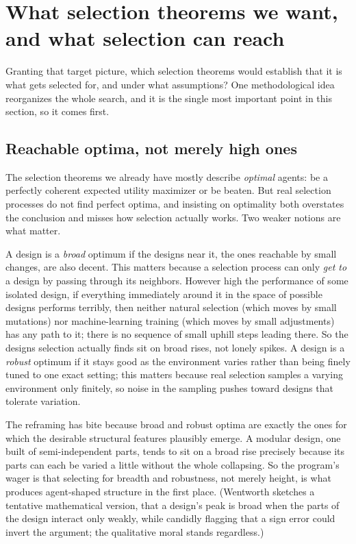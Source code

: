 \documentclass[10pt]{article}
\theoremstyle{definition}
\theoremstyle{remark}
\begin{document}
\section{What selection theorems we want, and what selection can reach}
\label{sec:wishlist}

Granting that target picture, which selection theorems would establish that it is what gets selected for, and under what assumptions? One methodological idea reorganizes the whole search, and it is the single most important point in this section, so it comes first.

\subsection{Reachable optima, not merely high ones}

The selection theorems we already have mostly describe \emph{optimal} agents: be a perfectly coherent expected utility maximizer or be beaten. But real selection processes do not find perfect optima, and insisting on optimality both overstates the conclusion and misses how selection actually works. Two weaker notions are what matter.

A design is a \emph{broad} optimum if the designs near it, the ones reachable by small changes, are also decent. This matters because a selection process can only \emph{get to} a design by passing through its neighbors. However high the performance of some isolated design, if everything immediately around it in the space of possible designs performs terribly, then neither natural selection (which moves by small mutations) nor machine-learning training (which moves by small adjustments) has any path to it; there is no sequence of small uphill steps leading there. So the designs selection actually finds sit on broad rises, not lonely spikes. A design is a \emph{robust} optimum if it stays good as the environment varies rather than being finely tuned to one exact setting; this matters because real selection samples a varying environment only finitely, so noise in the sampling pushes toward designs that tolerate variation.

The reframing has bite because broad and robust optima are exactly the ones for which the desirable structural features plausibly emerge. A modular design, one built of semi-independent parts, tends to sit on a broad rise precisely because its parts can each be varied a little without the whole collapsing. So the program's wager is that selecting for breadth and robustness, not merely height, is what produces agent-shaped structure in the first place. (Wentworth sketches a tentative mathematical version, that a design's peak is broad when the parts of the design interact only weakly, while candidly flagging that a sign error could invert the argument; the qualitative moral stands regardless.)
\end{document}
